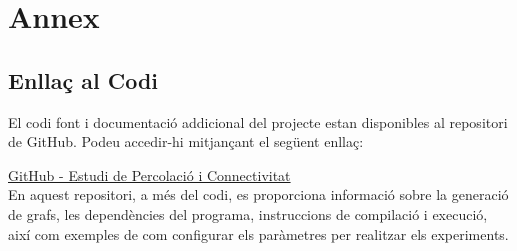 \documentclass[a4paper]{article}
\begin{document}
	\newpage
	\section{Annex}
	
	\subsection*{Enllaç al Codi}
	
	El codi font i documentació addicional del projecte estan disponibles al repositori de GitHub. Podeu accedir-hi mitjançant el següent enllaç:
	
	\href{https://github.com/Willyllem88/PercolationConnectivity}{GitHub - Estudi de Percolació i Connectivitat} \\
	
	En aquest repositori, a més del codi, es proporciona informació sobre la generació de grafs, les dependències del programa, instruccions de compilació i execució, així com exemples de com configurar els paràmetres per realitzar els experiments.
	
	
\end{document}
